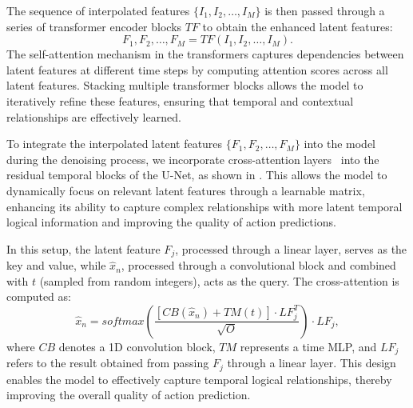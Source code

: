 The sequence of interpolated features $\{I_1, I_2, \dots, I_M\}$ is then passed through a series of transformer encoder blocks $TF$ to obtain the enhanced latent features:
\begin{equation}
    F_1, F_2, \dots, F_M = TF(I_1, I_2, \dots, I_M).
\end{equation}
The self-attention mechanism in the transformers captures dependencies between latent features at different time steps by computing attention scores across all latent features. Stacking multiple transformer blocks allows the model to iteratively refine these features, ensuring that temporal and contextual relationships are effectively learned.



To integrate the interpolated latent features $\{F_1, F_2, \dots, F_M\}$ into the model during the denoising process, we incorporate cross-attention layers~\citep{khachatryan2023text2video} into the residual temporal blocks of the U-Net, as shown in . This allows the model to dynamically focus on relevant latent features through a learnable matrix, enhancing its ability to capture complex relationships with more latent temporal logical information and improving the quality of action predictions.

In this setup, the latent feature $F_j$, processed through a linear layer, serves as the key and value, while $\hat{x}_n$, processed through a convolutional block and combined with $t$ (sampled from random integers), acts as the query. The cross-attention is computed as:
\begin{equation}
    \hat{x}_n = softmax\left(\frac{\left[CB(\hat{x}_n) + TM(t)\right] \cdot LF_j^T}{\sqrt{O}}\right) \cdot LF_j,
\end{equation}
where $CB$ denotes a 1D convolution block, $TM$ represents a time MLP, and $LF_j$ refers to the result obtained from passing $F_j$ through a linear layer. This design enables the model to effectively capture temporal logical relationships, thereby improving the overall quality of action prediction.

